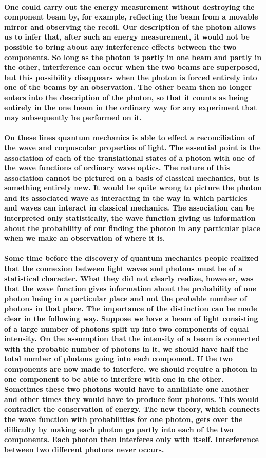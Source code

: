 \documentclass[10pt, kindle, oneside]{kindle}
\begin{document}
\paragraph{One could carry out the energy measurement without destroying the component beam by, for example, reflecting the beam from a movable mirror and observing the recoil. Our description of the photon allows us to infer that, after such an energy measurement, it would not be possible to bring about any interference effects between the two components. So long as the photon is partly in one beam and partly in the other, interference can occur when the two beams are superposed, but this possibility disappears when the photon is forced entirely into one of the beams by an observation. The other beam then no longer enters into the description of the photon, so that it counts as being entirely in the one beam in the ordinary way for any experiment that may subsequently be performed on it.}
\paragraph{On these lines quantum mechanics is able to effect a reconciliation of the wave and corpuscular properties of light. The essential point is the association of each of the translational states of a photon with one of the wave functions of ordinary wave optics. The nature of this association cannot be pictured on a basis of classical mechanics, but is something entirely new. It would be quite wrong to picture the photon and its associated wave as interacting in the way in which particles and waves can interact in classical mechanics. The association can be interpreted only statistically, the wave function giving us information about the probability of our finding the photon in any particular place when we make an observation of where it is.}
\paragraph{Some time before the discovery of quantum mechanics people realized that the connexion between light waves and photons must be of a statistical character. What they did not clearly realize, however, was that the wave function gives information about the probability of one photon being in a particular place and not the probable number of photons in that place. The importance of the distinction can be made clear in the following way. Suppose we have a beam of light consisting of a large number of photons split up into two components of equal intensity. On the assumption that the intensity of a beam is connected with the probable number of photons in it, we should have half the total number of photons going into each component. If the two components are now made to interfere, we should require a photon in one component to be able to interfere with one in the other. Sometimes these two photons would have to annihilate one another and other times they would have to produce four photons. This would contradict the conservation of energy. The new theory, which connects the wave function with probabilities for one photon, gets over the difficulty by making each photon go partly into each of the two components. Each photon then interferes only with itself. Interference between two different photons never occurs.}
\end{document}
